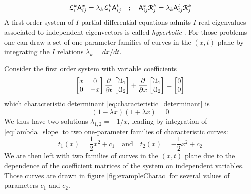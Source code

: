 \begin{equation}
  \label{eq:eigenvectors}
  \mathcal{L}^k_i  \mathsf{A}^x_{ij} = \lambda_k \mathcal{L}^k_i \mathsf{A}^t_{ij} \quad ; \quad \mathsf{A}^x_{ij}\mathcal{R}^k_j = \lambda_k \mathsf{A}^t_{ij}\mathcal{R}^k_j
\end{equation}
A first order system of $I$ partial differential equations admits $I$ real eigenvalues associated to independent eigenvectors is called \textit{hyperbolic} \cite{Courant}. For those problems one can draw a set of one-parameter families of curves in the $(x,t)$ plane by integrating the $I$ relations $\lambda_k=dx/dt$.
\begin{example}
  \label{ex:charac1}
  Consider the first order system with variable coefficients
\begin{equation*}
 \left[\begin{matrix}x &0 \\0 &-x\end{matrix}\right] \frac{\partial }{\partial t} \left[\begin{matrix}\mathcal{U}_1 \\ \mathcal{U}_2\end{matrix}\right] + \frac{\partial }{\partial x}\left[\begin{matrix}\mathcal{U}_1 \\ \mathcal{U}_2\end{matrix}\right] = \left[\begin{matrix}0 \\0\end{matrix}\right]
\end{equation*}
which characteristic determinant \eqref{eq:characteristic_determinant} is
\begin{equation*}
  (1-\lambda x)(1+\lambda x)=0
\end{equation*}
We thus have two solutions $\lambda_{1,2}=\pm 1/x$, leading by integration of \eqref{eq:lambda_slope} to two one-parameter families of characteristic curves:
\begin{equation*}
  t_1(x)=\frac{1}{2}x^2+c_1  \quad \text{and} \quad t_2(x)=-\frac{1}{2}x^2+c_2 
\end{equation*}
We are then left with two families of curves in the $(x,t)$ plane due to the dependence of the coefficient matrices of the system on independent variables. Those curves are drawn in figure \ref{fig:exampleCharac} for several values of parameters $c_1$ and $c_2$.
\end{example}
